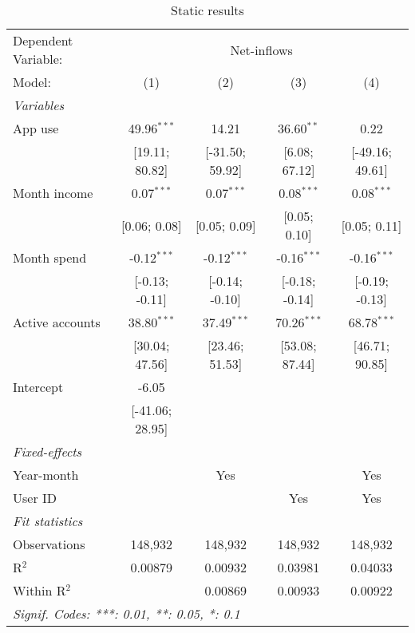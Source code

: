 
\begin{table}[htbp]
   \centering
   \tiny
   \begin{threeparttable}[b]
      \caption{\label{tab:reg_static} Static results}
      \begin{tabular}{lcccc}
         \tabularnewline \midrule \midrule
         Dependent Variable: & \multicolumn{4}{c}{Net-inflows}\\
         Model:          & (1)             & (2)             & (3)            & (4)\\  
         \midrule
         \emph{Variables}\\
         App use         & 49.96$^{***}$   & 14.21           & 36.60$^{**}$   & 0.22\\   
                         & [19.11; 80.82]  & [-31.50; 59.92] & [6.08; 67.12]  & [-49.16; 49.61]\\   
         Month income    & 0.07$^{***}$    & 0.07$^{***}$    & 0.08$^{***}$   & 0.08$^{***}$\\   
                         & [0.06; 0.08]    & [0.05; 0.09]    & [0.05; 0.10]   & [0.05; 0.11]\\   
         Month spend     & -0.12$^{***}$   & -0.12$^{***}$   & -0.16$^{***}$  & -0.16$^{***}$\\   
                         & [-0.13; -0.11]  & [-0.14; -0.10]  & [-0.18; -0.14] & [-0.19; -0.13]\\   
         Active accounts & 38.80$^{***}$   & 37.49$^{***}$   & 70.26$^{***}$  & 68.78$^{***}$\\   
                         & [30.04; 47.56]  & [23.46; 51.53]  & [53.08; 87.44] & [46.71; 90.85]\\   
         Intercept       & -6.05           &                 &                &   \\   
                         & [-41.06; 28.95] &                 &                &   \\   
         \midrule
         \emph{Fixed-effects}\\
         Year-month      &                 & Yes             &                & Yes\\  
         User ID         &                 &                 & Yes            & Yes\\  
         \midrule
         \emph{Fit statistics}\\
         Observations    & 148,932         & 148,932         & 148,932        & 148,932\\  
         R$^2$           & 0.00879         & 0.00932         & 0.03981        & 0.04033\\  
         Within R$^2$    &                 & 0.00869         & 0.00933        & 0.00922\\  
         \midrule \midrule
         \multicolumn{5}{l}{\emph{Signif. Codes: ***: 0.01, **: 0.05, *: 0.1}}\\
      \end{tabular}
   \end{threeparttable}
\end{table}



